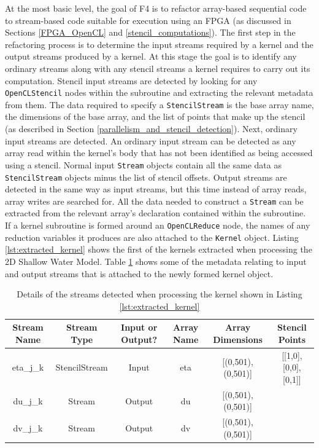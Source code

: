 \documentclass{mpaper}
\begin{document}
At the most basic level, the goal of F4 is to refactor array-based sequential code to stream-based code suitable for execution using an FPGA (as discussed in Sections \ref{FPGA_OpenCL} and \ref{stencil_computations}).
The first step in the refactoring process is to determine the input streams required by a kernel and the output streams produced by a kernel. 
At this stage the goal is to identify any ordinary streams along with any stencil streams a kernel requires to carry out its computation.
Stencil input streams are detected by looking for any \texttt{OpenCLStencil} nodes within the subroutine and extracting the relevant metadata from them.
The data required to specify a \texttt{StencilStream} is the base array name, the dimensions of the base array, and the list of points that make up the stencil (as described in Section \ref{parallelism_and_stencil_detection}). 
Next, ordinary input streams are detected.
An ordinary input stream can be detected as any array read within the kernel's body that has not been identified as being accessed using a stencil.
Normal input \texttt{Stream} objects contain all the same data as \texttt{StencilStream} objects minus the list of stencil offsets.
Output streams are detected in the same way as input streams, but this time instead of array reads, array writes are searched for. 
All the data needed to construct a \texttt{Stream} can be extracted from the relevant array's declaration contained within the subroutine. 
If a kernel subroutine is formed around an \texttt{OpenCLReduce} node, the names of any reduction variables it produces are also attached to the \texttt{Kernel} object.
Listing \ref{lst:extracted_kernel} shows the first of the kernels extracted when processing the 2D Shallow Water Model.
Table \ref{table:kernel_stream} shows some of the metadata relating to input and output streams that is attached to the newly formed kernel object.
\begin{table}[]
\begin{tabular}{c|c|c|c|c|c}
\textbf{Stream Name} & \textbf{Stream Type} & \textbf{Input or Output?} & \textbf{Array Name} & \textbf{Array Dimensions} & \textbf{Stencil Points}             \\ \hline
eta\_j\_k            & StencilStream        & Input                     & eta                      & {[}(0,501),(0,501){]}         & {[}{[}1,0{]},{[}0,0{]},{[}0,1{]}{]} \\
du\_j\_k             & Stream               & Output                    & du                       & {[}(0,501),(0,501){]}         &                                     \\
dv\_j\_k             & Stream               & Output                    & dv                       & {[}(0,501),(0,501){]}         &                                    
\end{tabular}
\caption{Details of the streams detected when processing the kernel shown in Listing \ref{lst:extracted_kernel}}
\label{table:kernel_stream}
\end{table}
\end{document}
